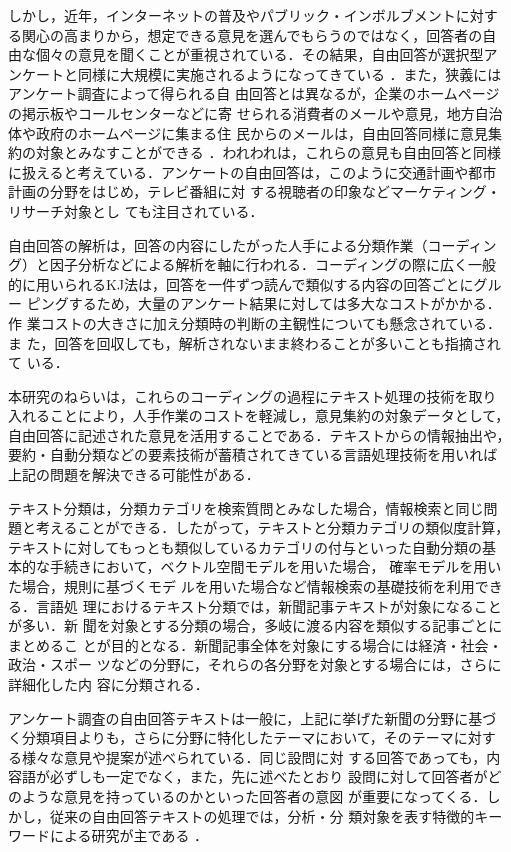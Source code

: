 しかし，近年，インターネットの普及やパブリック・インボルブメントに対す
る関心の高まりから，想定できる意見を選んでもらうのではなく，回答者の自
由な個々の意見を聞くことが重視されている．その結果，自由回答が選択型ア
ンケートと同様に大規模に実施されるようになってきている
\cite{voice_report:96}．また，狭義にはアンケート調査によって得られる自
由回答とは異なるが，企業のホームページの掲示板やコールセンターなどに寄
せられる消費者のメールや意見，地方自治体や政府のホームページに集まる住
民からのメールは，自由回答同様に意見集約の対象とみなすことができる
\cite{nasukawa:01,yanase:02}．われわれは，これらの意見も自由回答と同様
に扱えると考えている．アンケートの自由回答は，このように交通計画や都市
計画の分野をはじめ\cite{suga:97,matsuda:98,takata:00}，テレビ番組に対
する視聴者の印象\cite{hitachi:00}などマーケティング・リサーチ対象とし
ても注目されている．

自由回答の解析は，回答の内容にしたがった人手による分類作業（コーディン
グ）と因子分析などによる解析を軸に行われる．コーディングの際に広く一般
的に用いられるKJ法は，回答を一件ずつ読んで類似する内容の回答ごとにグルー
ピングするため，大量のアンケート結果に対しては多大なコストがかかる．作
業コストの大きさに加え分類時の判断の主観性についても懸念されている．ま
た，回答を回収しても，解析されないまま終わることが多いことも指摘されて
いる\cite{arima:87}．

本研究のねらいは，これらのコーディングの過程にテキスト処理の技術を取り
入れることにより，人手作業のコストを軽減し，意見集約の対象データとして，
自由回答に記述された意見を活用することである．テキストからの情報抽出や，
要約・自動分類などの要素技術が蓄積されてきている言語処理技術を用いれば
上記の問題を解決できる可能性がある．

テキスト分類は，分類カテゴリを検索質問とみなした場合，情報検索と同じ問
題と考えることができる．したがって，テキストと分類カテゴリの類似度計算，
テキストに対してもっとも類似しているカテゴリの付与といった自動分類の基
本的な手続きにおいて，ベクトル空間モデルを用いた場合\cite{salton:88}，
確率モデルを用いた場合\cite{robertson:76,iwayama:94}，規則に基づくモデ
ルを用いた場合\cite{apte:94}など情報検索の基礎技術を利用できる．言語処
理におけるテキスト分類では，新聞記事テキストが対象になることが多い．新
聞を対象とする分類の場合，多岐に渡る内容を類似する記事ごとにまとめるこ
とが目的となる．新聞記事全体を対象にする場合には経済・社会・政治・スポー
ツなどの分野に，それらの各分野を対象とする場合には，さらに詳細化した内
容に分類される．

アンケート調査の自由回答テキストは一般に，上記に挙げた新聞の分野に基づ
く分類項目よりも，さらに分野に特化したテーマにおいて，そのテーマに対す
る様々な意見や提案が述べられている\cite{voice_report:96}．同じ設問に対
する回答であっても，内容語が必ずしも一定でなく，また，先に述べたとおり
設問に対して回答者がどのような意見を持っているのかといった回答者の意図
が重要になってくる．しかし，従来の自由回答テキストの処理では，分析・分
類対象を表す特徴的キーワードによる研究が主である
\cite{suga:97,oosumi:97,li:01}．

